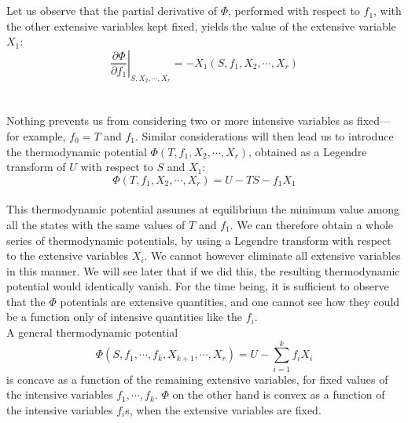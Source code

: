 \documentclass[cyan]{elegantnote}
\begin{document}
\\ \\
Let us observe that the partial derivative of $\Phi$, performed with respect to $f_1$, with the other extensive variables kept fixed, yields the value of the extensive variable $X_1$:
\[ \left. \frac{\partial \Phi}{\partial f_1} \right|_{S,X_2,\cdots,X_r} = -X_1(S,f_1,X_2,\cdots,X_r)\]
\\ \\
Nothing prevents us from considering two or more intensive variables as fixed—for example, $f_0 = T$ and $f_1$. Similar considerations will then lead us to introduce the thermodynamic potential $\Phi(T,f_1,X_2,\cdots,X_r)$, obtained as a Legendre transform of $U$ with respect to $S$ and $X_1$:
\[\Phi(T,f_1,X_2,\cdots,X_r) = U - TS - f_1X_1\]
\\
This thermodynamic potential assumes at equilibrium the minimum value among all the states with the same values of $T$ and $f_1$. We can therefore obtain a whole series of thermodynamic potentials, by using a Legendre transform with respect to the extensive variables $X_i$. We cannot however eliminate all extensive variables in this manner. We will see later that if we did this, the resulting thermodynamic potential would identically vanish. For the time being, it is sufficient to observe that the $\Phi$ potentials are extensive quantities, and one cannot see how they could be a function only of intensive quantities like the $f_i$.
\\
A general thermodynamic potential
\[\Phi(S,f_1,\cdots,f_k,X_{k+1},\cdots,X_r) = U - \sum_{i = 1}^{k} f_i X_i\]
is concave as a function of the remaining extensive variables, for fixed values of the intensive variables $f_1,\cdots,f_k$.
$\Phi$ on the other hand is convex as a function of the intensive variables $f_i$s, when the extensive variables are fixed.
\end{document}
